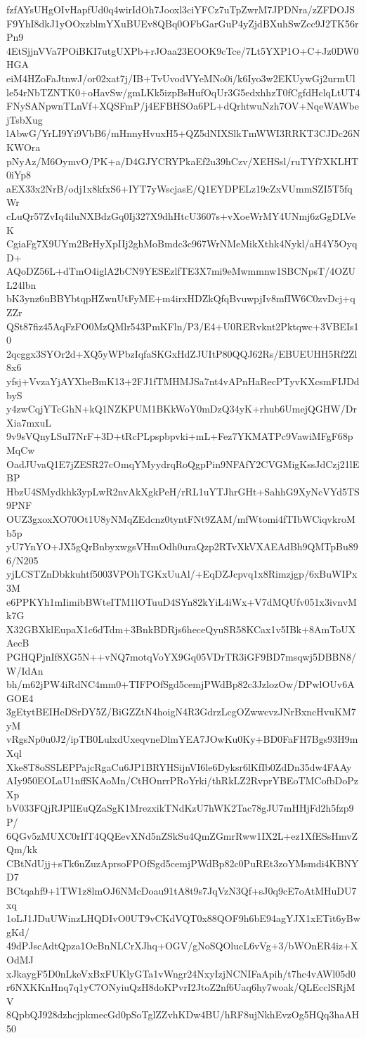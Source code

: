 fzfAYsUHgOIvHapfUd0q4wirIdOh7Jooxl3ciYFCz7uTpZwrM7JPDNra/zZFDOJS
F9YhI8dkJ1yOOxzblmYXuBUEv8QBq0OFbGarGuP4yZjdBXuhSwZcc9J2TK56rPn9
4EtSjjnVVa7POiBKI7utgUXPb+rJOaa23EOOK9cTce/7Lt5YXP1O+C+Jz0DW0HGA
eiM4HZoFaJtnwJ/or02xat7j/IB+TvUvodVYeMNo0i/k6Iyo3w2EKUywGj2urmUl
le54rNbTZNTK0+oHavSw/gmLKk5izpBsHufOqUr3G5edxhhzT0fCgfdHclqLtUT4
FNySANpwnTLnVf+XQSFmP/j4EFBHSOa6PL+dQrhtwuNzh7OV+NqeWAWbejTsbXug
lAbwG/YrLI9Yi9VbB6/mHnnyHvuxH5+QZ5dNIXSlkTmWWI3RRKT3CJDc26NKWOra
pNyAz/M6OymvO/PK+a/D4GJYCRYPkaEf2u39hCzv/XEHSsl/ruTYf7XKLHT0iYp8
aEX33x2NrB/odj1x8kfxS6+IYT7yWscjasE/Q1EYDPELz19cZxVUmmSZI5T5fqWr
cLuQr57ZvIq4iluNXBdzGq0Ij327X9dhHtcU3607s+vXoeWrMY4UNmj6zGgDLVeK
CgiaFg7X9UYm2BrHyXpIIj2ghMoBmdc3c967WrNMeMikXthk4Nykl/aH4Y5OyqD+
AQoDZ56L+dTmO4iglA2bCN9YESEzlfTE3X7mi9eMwmmnw1SBCNpsT/4OZUL24lbn
bK3ynz6uBBYbtqpHZwnUtFyME+m4irxHDZkQfqBvuwpjIv8mfIW6C0zvDcj+qZZr
QSt87fiz45AqFzFO0MzQMlr543PmKFln/P3/E4+U0RERvknt2Pktqwc+3VBEIs10
2qcggx3SYOr2d+XQ5yWPbzIqfaSKGxHdZJUItP80QQJ62Rs/EBUEUHH5Rf2Zl8x6
yfsj+VvzaYjAYXheBmK13+2FJ1fTMHMJSa7nt4vAPnHaRecPTyvKXcsmFIJDdbyS
y4zwCqjYTcGhN+kQ1NZKPUM1BKkWoY0mDzQ34yK+rhub6UmejQGHW/DrXia7mxuL
9v9sVQnyLSuI7NrF+3D+tRcPLpspbpvki+mL+Fez7YKMATPc9VawiMFgF68pMqCw
OadJUvaQ1E7jZESR27cOmqYMyydrqRoQgpPin9NFAfY2CVGMigKssJdCzj21lEBP
HbzU4SMydkhk3ypLwR2nvAkXgkPeH/rRL1uYTJhrGHt+SahhG9XyNcVYd5TS9PNF
OUZ3gxoxXO70Ot1U8yNMqZEdcnz0tyntFNt9ZAM/mfWtomi4fTIbWCiqvkroMb5p
yU7YnYO+JX5gQrBnbyxwgsVHmOdh0uraQzp2RTvXkVXAEAdBh9QMTpBu896/N205
yjLCSTZnDbkkuhtf5003VPOhTGKxUuAl/+EqDZJcpvq1x8Rimzjgp/6xBuWIPx3M
e6PPKYh1mIimibBWteITM1lOTuuD4SYn82kYiL4iWx+V7dMQUfv051x3ivnvMk7G
X32GBXklEupaX1c6dTdm+3BnkBDRjs6heceQyuSR58KCax1v5IBk+8AmToUXAecB
PGHQPjnIf8XG5N++vNQ7motqVoYX9Gq05VDrTR3iGF9BD7msqwj5DBBN8/W/IdAn
bh/m62jPW4iRdNC4mm0+TIFPOfSgd5cemjPWdBp82c3JzlozOw/DPwlOUv6AGOE4
3gEtytBEIHeDSrDY5Z/BiGZZtN4hoigN4R3GdrzLcgOZwwcvzJNrBxncHvuKM7yM
vRgsNp0u0J2/ipTB0LulxdUxeqvneDlmYEA7JOwKu0Ky+BD0FaFH7Bgs93H9mXql
Xke8T8oSSLEPPajcRgaCu6JP1BRYHSijnVI6le6Dyksr6lKfIb0ZdDn35dw4FAAy
AIy950EOLaU1nffSKAoMn/CtHOnrrPRoYrki/thRkLZ2RvprYBEoTMCofbDoPzXp
bV033FQjRJPlIEuQZaSgK1MrezxikTNdKzU7hWK2Tac78gJU7mHHjFd2h5fzp9P/
6QGv5zMUXC0rIfT4QQEevXNd5nZSkSu4QmZGmrRww1IX2L+ez1XfESsHmvZQm/kk
CBtNdUjj+sTk6nZuzAprsoFPOfSgd5cemjPWdBp82c0PuREt3zoYMsmdi4KBNYD7
BCtqahf9+1TW1z8lmOJ6NMcDoau91tA8t9s7JqVzN3Qf+sJ0q9cE7oAtMHuDU7xq
1oLJ1JDuUWinzLHQDIvO0UT9vCKdVQT0x88QOF9h6bE94agYJX1xETit6yBwgKd/
49dPJscAdtQpza1OcBnNLCrXJhq+OGV/gNoSQOlucL6vVg+3/bWOnER4iz+XOdMJ
xJkaygF5D0nLkeVxBxFUKlyGTa1vWngr24NxyIzjNCNIFaApih/t7hc4vAWl05d0
r6NXKKnHnq7q1yC7ONyiuQzH8doKPvrI2JtoZ2nf6Uaq6hy7woak/QLEcclSRjMV
8QpbQJ928dzhcjpkmecGd0pSoTglZZvhKDw4BU/hRF8ujNkhEvzOg5HQq3haAH50
